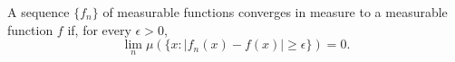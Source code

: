 A sequence $\{f_n\}$ of measurable functions converges in measure to a measurable function $f$ if, for every $\epsilon > 0$,
$$\lim_n \mu(\{x: |f_n(x) - f(x)| \geq \epsilon\}) = 0.$$
